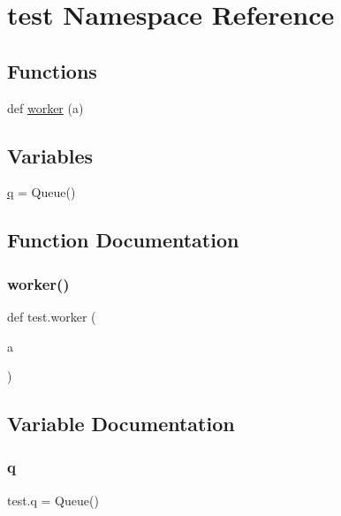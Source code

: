 \hypertarget{namespacetest}{}\section{test Namespace Reference}
\label{namespacetest}
\subsection*{Functions}
\begin{DoxyCompactItemize}
\item 
def \hyperlink{namespacetest_a408ce57be7f1ae390218c518e0de353f}{worker} (a)
\end{DoxyCompactItemize}
\subsection*{Variables}
\begin{DoxyCompactItemize}
\item 
\hyperlink{namespacetest_ace06991c89abd4731882ffe86a19ab34}{q} = Queue()
\end{DoxyCompactItemize}


\subsection{Function Documentation}
\mbox{\label{namespacetest_a408ce57be7f1ae390218c518e0de353f}} 
\subsubsection{\texorpdfstring{worker()}{worker()}}
{\footnotesize\ttfamily def test.\+worker (\begin{DoxyParamCaption}\item[{}]{a }\end{DoxyParamCaption})}



\subsection{Variable Documentation}
\mbox{\label{namespacetest_ace06991c89abd4731882ffe86a19ab34}} 
\subsubsection{\texorpdfstring{q}{q}}
{\footnotesize\ttfamily test.\+q = Queue()}

